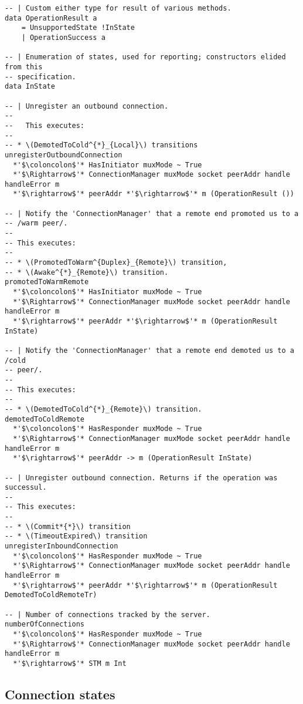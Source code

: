 \begin{lstlisting}
-- | Custom either type for result of various methods.
data OperationResult a
    = UnsupportedState !InState
    | OperationSuccess a

-- | Enumeration of states, used for reporting; constructors elided from this
-- specification.
data InState

-- | Unregister an outbound connection.
--
--   This executes:
--
-- * \(DemotedToCold^{*}_{Local}\) transitions
unregisterOutboundConnection
  *'$\coloncolon$'* HasInitiator muxMode ~ True
  *'$\Rightarrow$'* ConnectionManager muxMode socket peerAddr handle handleError m
  *'$\rightarrow$'* peerAddr *'$\rightarrow$'* m (OperationResult ())

-- | Notify the 'ConnectionManager' that a remote end promoted us to a
-- /warm peer/.
--
-- This executes:
--
-- * \(PromotedToWarm^{Duplex}_{Remote}\) transition,
-- * \(Awake^{*}_{Remote}\) transition.
promotedToWarmRemote
  *'$\coloncolon$'* HasInitiator muxMode ~ True
  *'$\Rightarrow$'* ConnectionManager muxMode socket peerAddr handle handleError m
  *'$\rightarrow$'* peerAddr *'$\rightarrow$'* m (OperationResult InState)

-- | Notify the 'ConnectionManager' that a remote end demoted us to a /cold
-- peer/.
--
-- This executes:
--
-- * \(DemotedToCold^{*}_{Remote}\) transition.
demotedToColdRemote
  *'$\coloncolon$'* HasResponder muxMode ~ True
  *'$\Rightarrow$'* ConnectionManager muxMode socket peerAddr handle handleError m
  *'$\rightarrow$'* peerAddr -> m (OperationResult InState)

-- | Unregister outbound connection. Returns if the operation was successul.
--
-- This executes:
--
-- * \(Commit*{*}\) transition
-- * \(TimeoutExpired\) transition
unregisterInboundConnection
  *'$\coloncolon$'* HasResponder muxMode ~ True
  *'$\Rightarrow$'* ConnectionManager muxMode socket peerAddr handle handleError m
  *'$\rightarrow$'* peerAddr *'$\rightarrow$'* m (OperationResult DemotedToColdRemoteTr)

-- | Number of connections tracked by the server.
numberOfConnections
  *'$\coloncolon$'* HasResponder muxMode ~ True
  *'$\Rightarrow$'* ConnectionManager muxMode socket peerAddr handle handleError m
  *'$\rightarrow$'* STM m Int
\end{lstlisting}

\subsection{Connection states}\label{sec:connection-state}

